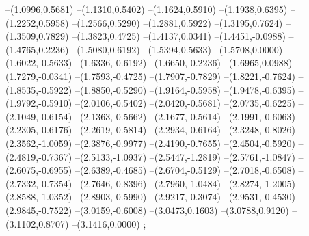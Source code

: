 {--(1.0996,0.5681)
--(1.1310,0.5402)
--(1.1624,0.5910)
--(1.1938,0.6395)
--(1.2252,0.5958)
--(1.2566,0.5290)
--(1.2881,0.5922)
--(1.3195,0.7624)
--(1.3509,0.7829)
--(1.3823,0.4725)
--(1.4137,0.0341)
--(1.4451,-0.0988)
--(1.4765,0.2236)
--(1.5080,0.6192)
--(1.5394,0.5633)
--(1.5708,0.0000)
--(1.6022,-0.5633)
--(1.6336,-0.6192)
--(1.6650,-0.2236)
--(1.6965,0.0988)
--(1.7279,-0.0341)
--(1.7593,-0.4725)
--(1.7907,-0.7829)
--(1.8221,-0.7624)
--(1.8535,-0.5922)
--(1.8850,-0.5290)
--(1.9164,-0.5958)
--(1.9478,-0.6395)
--(1.9792,-0.5910)
--(2.0106,-0.5402)
--(2.0420,-0.5681)
--(2.0735,-0.6225)
--(2.1049,-0.6154)
--(2.1363,-0.5662)
--(2.1677,-0.5614)
--(2.1991,-0.6063)
--(2.2305,-0.6176)
--(2.2619,-0.5814)
--(2.2934,-0.6164)
--(2.3248,-0.8026)
--(2.3562,-1.0059)
--(2.3876,-0.9977)
--(2.4190,-0.7655)
--(2.4504,-0.5920)
--(2.4819,-0.7367)
--(2.5133,-1.0937)
--(2.5447,-1.2819)
--(2.5761,-1.0847)
--(2.6075,-0.6955)
--(2.6389,-0.4685)
--(2.6704,-0.5129)
--(2.7018,-0.6508)
--(2.7332,-0.7354)
--(2.7646,-0.8396)
--(2.7960,-1.0484)
--(2.8274,-1.2005)
--(2.8588,-1.0352)
--(2.8903,-0.5990)
--(2.9217,-0.3074)
--(2.9531,-0.4530)
--(2.9845,-0.7522)
--(3.0159,-0.6008)
--(3.0473,0.1603)
--(3.0788,0.9120)
--(3.1102,0.8707)
--(3.1416,0.0000)
;}
